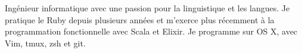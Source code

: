 

\begin{cvparagraph}

Ingénieur informatique avec une passion pour la linguistique et les langues.
Je pratique le Ruby depuis plusieurs années et m'exerce plus récemment à la
programmation fonctionnelle avec Scala et Elixir. Je programme sur OS X, avec
Vim, tmux, zsh et git.
\end{cvparagraph}
